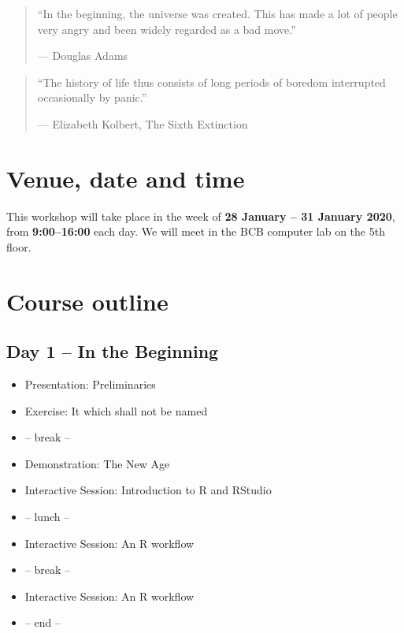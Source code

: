 \documentclass[
]{book}
\providecommand{\tightlist}{%
  \setlength{\itemsep}{0pt}\setlength{\parskip}{0pt}}
\begin{document}
\begin{quote}
``In the beginning, the universe was created. This has made a lot of people very angry and been widely regarded as a bad move.''

--- Douglas Adams
\end{quote}

\begin{quote}
``The history of life thus consists of long periods of boredom interrupted occasionally by panic.''

--- Elizabeth Kolbert, The Sixth Extinction
\end{quote}

\hypertarget{venue-date-and-time}{%
\section{Venue, date and time}\label{venue-date-and-time}}

This workshop will take place in the week of \textbf{28 January -- 31 January 2020}, from \textbf{9:00--16:00} each day. We will meet in the BCB computer lab on the 5th floor.

\hypertarget{course-outline}{%
\section{Course outline}\label{course-outline}}

\hypertarget{day-1-in-the-beginning}{%
\subsection*{Day 1 -- In the Beginning}\label{day-1-in-the-beginning}}

\begin{itemize}
\tightlist
\item
  Presentation: Preliminaries
\item
  Exercise: It which shall not be named
\item
  -- break --
\item
  Demonstration: The New Age
\item
  Interactive Session: Introduction to R and RStudio
\item
  -- lunch --
\item
  Interactive Session: An R workflow
\item
  -- break --
\item
  Interactive Session: An R workflow
\item
  -- end --
\end{itemize}
\end{document}
